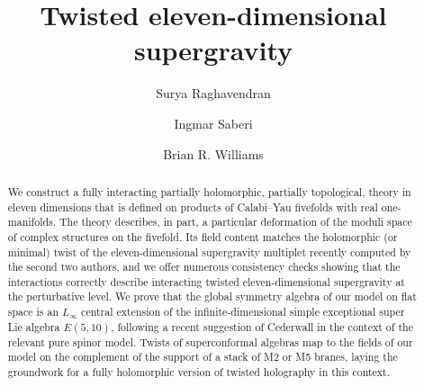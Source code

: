 \documentclass[11pt]{amsart}
\begin{document}
\title{Twisted eleven-dimensional supergravity}
\author{Surya Raghavendran}
\address{Perimeter Institute for Theoretical Physics \\ 31 Caroline Street North \\ 
Waterloo, Ontario N2L 2Y5\\ Canada}
\author{Ingmar Saberi}
\address{Ludwig-Maximilians-Universit\"at M\"unchen \\ Fakult\"at f\"ur Physik \\ Theresienstra\ss{}e 37 \\ 80333 M\"unchen \\ Deutschland}
\author{Brian R. Williams}
\address{School of Mathematics \\ University of Edinburgh \\ Edinburgh EH9 3FD \\ Scotland}
\begin{abstract}
We construct a fully interacting partially holomorphic, partially topological, theory in eleven dimensions that is defined on products of Calabi--Yau fivefolds with real one-manifolds. 
The theory describes, in part, a particular deformation of the moduli space of complex structures on the fivefold.
Its field content matches the holomorphic (or minimal) twist of the 
eleven-dimensional supergravity multiplet recently computed by the second two authors, and we offer numerous consistency checks showing that the interactions  correctly  describe interacting twisted eleven-dimensional supergravity at the perturbative level. 
We prove that the global symmetry algebra of our model on flat space is an $L_\infty$ central extension of the infinite-dimensional simple exceptional super Lie algebra $E(5,10)$, following a recent suggestion of Cederwall in the context of the relevant pure spinor model. 
Twists of superconformal algebras map to the fields of our model on the complement of the support of a stack of M2 or M5 branes, laying the groundwork for a fully holomorphic version of twisted holography in this context.
\end{abstract}
\maketitle

\vfill\eject

\setcounter{tocdepth}{1}
\tableofcontents

 














\printbibliography
\end{document}
